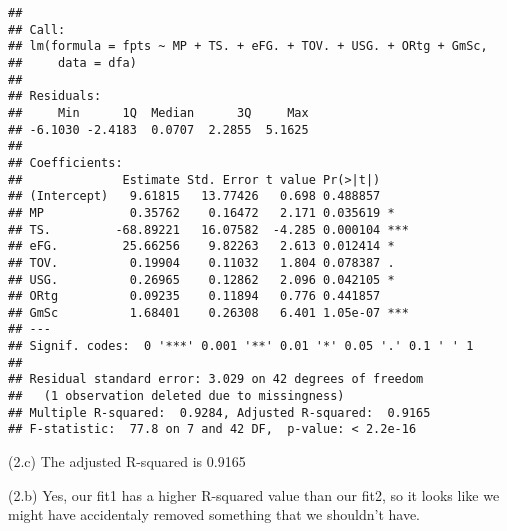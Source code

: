 \documentclass[
]{article}
\begin{document}
\begin{verbatim}
## 
## Call:
## lm(formula = fpts ~ MP + TS. + eFG. + TOV. + USG. + ORtg + GmSc, 
##     data = dfa)
## 
## Residuals:
##     Min      1Q  Median      3Q     Max 
## -6.1030 -2.4183  0.0707  2.2855  5.1625 
## 
## Coefficients:
##              Estimate Std. Error t value Pr(>|t|)    
## (Intercept)   9.61815   13.77426   0.698 0.488857    
## MP            0.35762    0.16472   2.171 0.035619 *  
## TS.         -68.89221   16.07582  -4.285 0.000104 ***
## eFG.         25.66256    9.82263   2.613 0.012414 *  
## TOV.          0.19904    0.11032   1.804 0.078387 .  
## USG.          0.26965    0.12862   2.096 0.042105 *  
## ORtg          0.09235    0.11894   0.776 0.441857    
## GmSc          1.68401    0.26308   6.401 1.05e-07 ***
## ---
## Signif. codes:  0 '***' 0.001 '**' 0.01 '*' 0.05 '.' 0.1 ' ' 1
## 
## Residual standard error: 3.029 on 42 degrees of freedom
##   (1 observation deleted due to missingness)
## Multiple R-squared:  0.9284, Adjusted R-squared:  0.9165 
## F-statistic:  77.8 on 7 and 42 DF,  p-value: < 2.2e-16
\end{verbatim}

(2.c) The adjusted R-squared is 0.9165

(2.b) Yes, our fit1 has a higher R-squared value than our fit2, so it
looks like we might have accidentaly removed something that we shouldn't
have.
\end{document}
